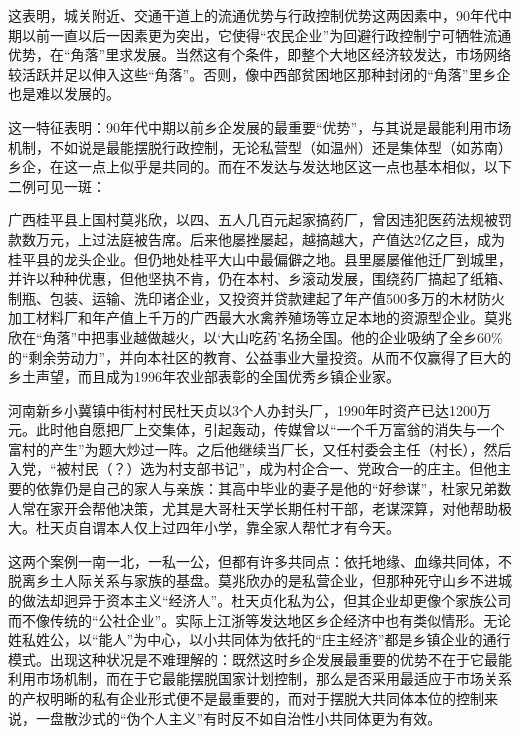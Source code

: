 \documentclass[a4paper,12pt,punct=kaiming]{ctexart}
\begin{document}
这表明，城关附近、交通干道上的流通优势与行政控制优势这两因素中，90年代中期以前一直以后一因素更为突出，它使得“农民企业”为回避行政控制宁可牺牲流通优势，在“角落”里求发展。当然这有个条件，即整个大地区经济较发达，市场网络较活跃并足以伸入这些“角落”。否则，像中西部贫困地区那种封闭的“角落”里乡企也是难以发展的。

这一特征表明：90年代中期以前乡企发展的最重要“优势”，与其说是最能利用市场机制，不如说是最能摆脱行政控制，无论私营型（如温州）还是集体型（如苏南）乡企，在这一点上似乎是共同的。而在不发达与发达地区这一点也基本相似，以下二例可见一斑：

广西桂平县上国村莫兆欣，以四、五人几百元起家搞药厂，曾因违犯医药法规被罚款数万元，上过法庭被告席。后来他屡挫屡起，越搞越大，产值达2亿之巨，成为桂平县的龙头企业。但仍地处桂平大山中最偏僻之地。县里屡屡催他迁厂到城里，并许以种种优惠，但他坚执不肯，仍在本村、乡滚动发展，围绕药厂搞起了纸箱、制瓶、包装、运输、洗印诸企业，又投资并贷款建起了年产值500多万的木材防火加工材料厂和年产值上千万的广西最大水禽养殖场等立足本地的资源型企业。莫兆欣在“角落”中把事业越做越火，以‘大山吃药’名扬全国。他的企业吸纳了全乡60\%的“剩余劳动力”，并向本社区的教育、公益事业大量投资。从而不仅赢得了巨大的乡土声望，而且成为1996年农业部表彰的全国优秀乡镇企业家。

河南新乡小冀镇中街村村民杜天贞以3个人办封头厂，1990年时资产已达1200万元。此时他自愿把厂上交集体，引起轰动，传媒曾以“一个千万富翁的消失与一个富村的产生”为题大炒过一阵。之后他继续当厂长，又任村委会主任（村长），然后入党，“被村民（？）选为村支部书记”，成为村企合一、党政合一的庄主。但他主要的依靠仍是自己的家人与亲族：其高中毕业的妻子是他的“好参谋”，杜家兄弟数人常在家开会帮他决策，尤其是大哥杜天学长期任村干部，老谋深算，对他帮助极大。杜天贞自谓本人仅上过四年小学，靠全家人帮忙才有今天。

这两个案例一南一北，一私一公，但都有许多共同点：依托地缘、血缘共同体，不脱离乡土人际关系与家族的基盘。莫兆欣办的是私营企业，但那种死守山乡不进城的做法却迥异于资本主义“经济人”。杜天贞化私为公，但其企业却更像个家族公司而不像传统的“公社企业”。实际上江浙等发达地区乡企经济中也有类似情形。无论姓私姓公，以“能人”为中心，以小共同体为依托的“庄主经济”都是乡镇企业的通行模式。出现这种状况是不难理解的：既然这时乡企发展最重要的优势不在于它最能利用市场机制，而在于它最能摆脱国家计划控制，那么是否采用最适应于市场关系的产权明晰的私有企业形式便不是最重要的，而对于摆脱大共同体本位的控制来说，一盘散沙式的“伪个人主义”有时反不如自治性小共同体更为有效。
\end{document}
